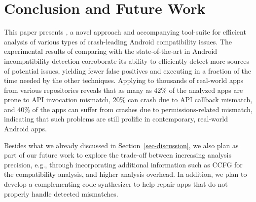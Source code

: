 \vspace{-0.3cm}
\section{Conclusion and Future Work}\label{sec-conclusion}
\vspace{-0.1cm}

This paper presents \@approach, a novel approach and
accompanying tool-suite for efficient analysis of various
types of crash-leading Android compatibility issues.  The
experimental results of comparing \@approach with the
state-of-the-art in Android incompatibility detection
corroborate its ability to efficiently detect more sources
of potential issues, yielding fewer false positives and
executing in a fraction of the time needed by the other
techniques.  Applying \@approach to thousands of real-world
apps from various repositories reveals that as many as 42\%
of the analyzed apps are prone to API invocation mismatch,
20\% can crash due to API callback mismatch, and 40\% of the
apps can suffer from crashes due to permissions-related
mismatch, indicating that such problems are still prolific
in contemporary, real-world Android apps. 

Besides what we already discussed in Section~\ref{sec-discussion}, we also plan as part of our future work to explore the trade-off between increasing analysis precision, e.g.,
through incorporating additional information such as CCFG for the compatibility analysis, and higher analysis overhead. In addition, we plan to develop a complementing code synthesizer to help repair apps that do not properly handle detected mismatches. 

\begin{comment}
\commentcs{
We also plan to develop new detectors to identify other events that can lead to dependability and security issues. 
Another idea
is to provide guidance to users to replace the use of
possibly outdated or deprecated APIs with more updated
ones.  For example, our system can recommend a
developer to replace the old SSL API with the new one.
While the old one still works,  it is less secure than
the newer API.
}
\end{comment}
 

 
